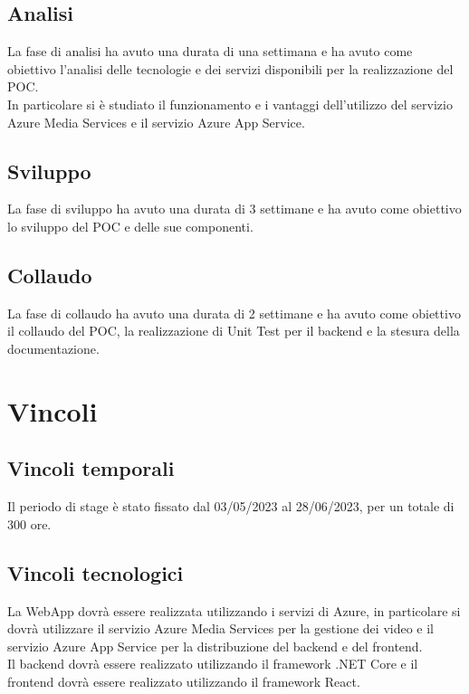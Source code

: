 \subsection{Analisi}
\label{subsec:analisi}
La fase di analisi ha avuto una durata di una settimana e ha avuto come obiettivo l'analisi delle tecnologie e dei servizi disponibili per la realizzazione del POC.\\
In particolare si è studiato il funzionamento e i vantaggi dell'utilizzo del servizio Azure Media Services e il servizio Azure App Service.\\

\subsection{Sviluppo}
\label{subsec:sviluppo}
La fase di sviluppo ha avuto una durata di 3 settimane e ha avuto come obiettivo lo sviluppo del POC e delle sue componenti.\\

\subsection{Collaudo}
\label{subsec:collaudo}
La fase di collaudo ha avuto una durata di 2 settimane e ha avuto come obiettivo il collaudo del POC, la realizzazione di Unit Test per il backend e la stesura della documentazione.\\
\section{Vincoli}
\label{sec:vincoli}
\subsection{Vincoli temporali}
\label{subsec:vincoli-temporali}
Il periodo di stage è stato fissato dal 03/05/2023 al 28/06/2023, per un totale di 300 ore.\\
\subsection{Vincoli tecnologici}
\label{subsec:vincoli-tecnologici}
La WebApp dovrà essere realizzata utilizzando i servizi di Azure, in particolare si dovrà utilizzare il servizio Azure Media Services per la gestione dei video e il servizio Azure App Service per la distribuzione del backend e del frontend.\\
Il backend dovrà essere realizzato utilizzando il framework .NET Core e il frontend dovrà essere realizzato utilizzando il framework React.\\
